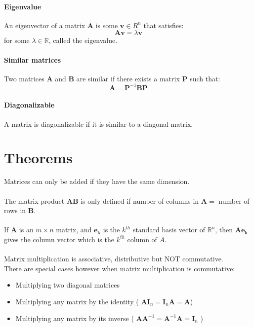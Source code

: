 \documentclass{scrartcl}
\newcommand{\R}{\mathbb{R}}
\renewcommand{\vec}[1]{\mathbf{#1}}
\begin{document}
\paragraph{Eigenvalue}
An eigenvector of a matrix $ \vec{A} $ is some $ \vec{v} \in R^{n} $ that satisfies:
\begin{equation}
\vec{A} \vec{v} = \lambda \vec{v}
\end{equation}
for some $ \lambda \in \R $, called the eigenvalue.

\paragraph{Similar matrices}
Two matrices $ \vec{A} $ and $ \vec{B} $ are similar if there exists a matrix $ \vec{P} $ such that:
\begin{equation}
\vec{A} = \vec{P}^{-1} \vec{B} \vec{P}
\end{equation}

\paragraph{Diagonalizable}
A matrix is diagonalizable if it is similar to a diagonal matrix.

\section{Theorems}

Matrices can only be added if they have the same dimension.
\\\\
The matrix product $ \vec{A} \vec{B} $ is only defined if number of columns in $ \vec{A} = $ number of rows in $ \vec{B} $.
\\\\
If $ \vec{A} $ is an $ m \times n $ matrix, and $ \vec{e_{k}} $ is the $ k^{th} $ standard basis vector of $ \R^{n} $, then $ \vec{A e_{k}} $ gives the column vector which is the $ k^{th} $ column of $ A $.
\\\\
Matrix multiplication is associative, distributive but NOT commutative.
\\
There are special cases however when matrix multiplication is commutative:
\begin{itemize}
\item Multiplying two diagonal matrices
\item Multiplying any matrix by the identity ( $ \vec{A}\vec{I}_{n} = \vec{I}_{n}\vec{A} = \vec{A} $)
\item Multiplying any matrix by its inverse ( $ \vec{A}\vec{A}^{-1} = \vec{A}^{-1}\vec{A} = \vec{I}_{n} $ )
\end{itemize}
\end{document}
